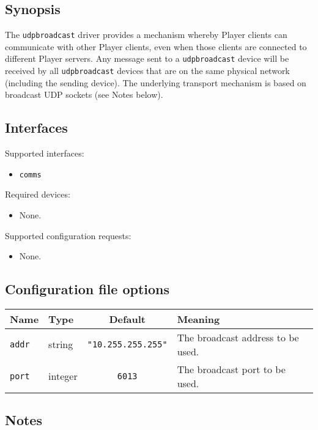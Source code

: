 \subsection*{Synopsis}
The {\tt udpbroadcast} driver provides a mechanism whereby Player clients can
communicate with other Player clients, even when those clients are connected
to different Player servers.  Any message sent to a {\tt udpbroadcast} device
will be received by all {\tt udpbroadcast} devices that are on the same
physical network (including the sending device).  The underlying transport
mechanism is based on broadcast UDP sockets (see Notes below).

\subsection*{Interfaces}

\noindent Supported interfaces:

\begin{itemize}
\item {\tt comms}
\end{itemize}

\noindent Required devices:
\begin{itemize}
\item None.
\end{itemize}

\noindent Supported configuration requests:
\begin{itemize}
\item None.
\end{itemize}


\subsection*{Configuration file options}

\begin{center}
{\small \begin{tabular}{|l|l|c|l|}
\hline
Name & Type & Default & Meaning\\
\hline
{\tt addr} & string & {\tt "10.255.255.255"} & The broadcast address to be
used.\\
{\tt port} & integer & {\tt 6013} & The broadcast port to be used.\\
\hline
\end{tabular}}
\end{center}

\subsection*{Notes}

